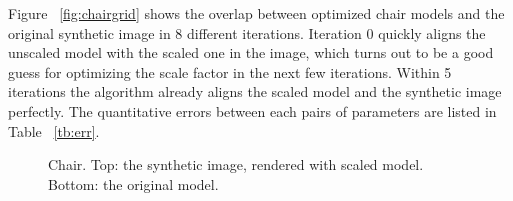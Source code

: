 \documentclass[10pt,twocolumn,letterpaper]{article}
\begin{document}
\noindent
Figure ~\ref{fig:chairgrid} shows the overlap between optimized chair models and the original synthetic image in 8 different iterations. Iteration 0 quickly aligns the unscaled model with the scaled one in the image, which turns out to be a good guess for optimizing the scale factor in the next few iterations. Within 5 iterations the algorithm already aligns the scaled model and the synthetic image perfectly. The quantitative errors between each pairs of parameters are listed in Table ~\ref{tb:err}.

\begin{figure}[t]
\begin{center}
   \quad
\end{center}
   \caption{Chair. Top: the synthetic image, rendered with scaled model. Bottom: the original model.}
\label{fig:chairmodel}
\end{figure}
\end{document}

